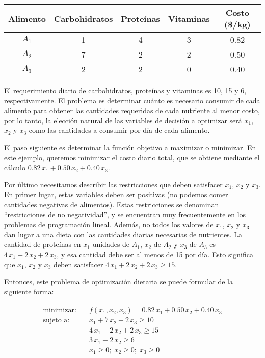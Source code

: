 \begin{center}
\begin{tabular}{ccccc}
\toprule
 Alimento & Carbohidratos & Proteínas & Vitaminas & Costo (\$/kg) \\
 \midrule
 $A_1$ & 1 & 4 & 3 & 0.82 \\
 $A_2$ & 7 & 2 & 2 & 0.50 \\
 $A_3$ & 2 & 2 & 0 & 0.40 \\
 \bottomrule
\end{tabular}
\end{center}

El requerimiento diario de carbohidratos, proteínas y vitaminas es 10, 15 y 6, respectivamente. El problema es determinar cuánto es necesario consumir de cada alimento para obtener las cantidades requeridas de cada nutriente al menor costo, por lo tanto, la elección natural de las variables de decisión a optimizar será $x_1$, $x_2$ y $x_3$ como las cantidades a consumir por día de cada alimento.

El paso siguiente es determinar la función objetivo a maximizar o minimizar. En este ejemplo, queremos minimizar el costo diario total, que se obtiene mediante el cálculo $0.82 \, x_1 + 0.50 \, x_2 + 0.40  \, x_3$.

Por último necesitamos describir las restricciones que deben satisfacer $x_1$, $x_2$ y $x_3$. En primer lugar, estas variables deben ser positivas (no podemos comer cantidades negativas de alimentos). Estas restricciones se denominan ``restricciones de no negatividad'', y se encuentran muy frecuentemente en los problemas de programación lineal. Además, no todos los valores de $x_1$, $x_2$ y $x_3$ dan lugar a una dieta con las cantidades diarias necesarias de nutrientes. La cantidad de proteínas en $x_1$ unidades de $A_1$, $x_2$ de $A_2$ y $x_3$ de $A_3$ es $4 \, x_1 + 2 \, x_2 + 2 \, x_3$, y esa cantidad debe ser al menos de 15 por día. Esto significa que $x_1$, $x_2$ y $x_3$ deben satisfacer $4 \, x_1 + 2 \, x_2 + 2 \, x_3 \geq 15$.

Entonces, este problema de optimización dietaria se puede formular de la siguiente forma:

\begin{align}
 \begin{split}
 \text{minimizar:}& \quad f(x_1, x_2, x_3) = 0.82 \, x_1 + 0.50 \, x_2 + 0.40  \, x_3 \\
 \text{sujeto a:}& \quad x_1 + 7 \, x_2 + 2 \, x_3 \geq 10 \\
 & \quad  4 \, x_1 + 2 \, x_2 + 2 \, x_3 \geq 15 \\
 & \quad  3 \, x_1 + 2 \,  x_2 \geq 6 \\
 & \quad  x_1 \geq 0; \; x_2 \geq 0; \; x_3 \geq 0
 \end{split}
 \label{eq:opt03}
\end{align}

